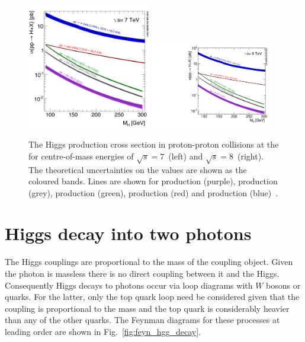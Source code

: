 \begin{figure}
  \includegraphics[width=0.48\textwidth]{theory/plots/Higgs_XS_7TeV_LM}
  \includegraphics[width=0.48\textwidth]{theory/plots/Higgs_XS_8TeV_LM}
  \caption[\acs{SM} Higgs production cross section at the \acs{LHC}]{The \SM Higgs production cross section in proton-proton collisions at the \LHC for centre-of-mass energies of $\sqrt{s}=7$~\TeV (left) and $\sqrt{s}=8$~\TeV (right). The theoretical uncertainties on the values are shown as the coloured bands. Lines are shown for \ttH production (purple), \ZH production (grey), \WH production (green), \VBF production (red) and \ggH production (blue)~\cite{LHCHiggsCrossSectionWorkingGroup3}.}
  \label{fig:higgs_xs}
\end{figure}

\section{Higgs decay into two photons}

The Higgs couplings are proportional to the mass of the coupling object. Given the photon is massless there is no direct coupling between it and the Higgs. Consequently Higgs decays to photons occur via loop diagrams with $W$ bosons or quarks. For the latter, only the top quark loop need be considered given that the coupling is proportional to the mass and the top quark is considerably heavier than any of the other quarks. The Feynman diagrams for these processes at leading order are shown in Fig.~\ref{fig:feyn_hgg_decay}.

